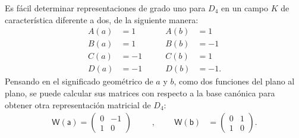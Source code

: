 \begin{ejemplo}[Representación de $D_4$]
Es fácil determinar representaciones de grado uno para $D_4$ en un campo $K$ de característica diferente a dos, de la siguiente manera:
\begin{equation*}
\begin{aligned}
A(a) & = 1\\
B(a) & = 1 \\ 
C(a) & = -1 \\
D(a) & = -1
\end{aligned}
\qquad 
\begin{aligned}
A(b) & = 1\\
B(b) & =  -1 \\
C(b) & = 1 \\
D(b) & = -1.
\end{aligned}
\end{equation*}
Pensando en el significado geométrico de $a$ y $b$, como dos funciones del plano al plano, se puede calcular sus matrices con respecto a la base canónica para obtener otra representación matricial de $D_4$:
\begin{equation*}
\begin{aligned}
\mathsf{W(a)} = \begin{pmatrix}
0 & -1 \\
1 & 0
\end{pmatrix}
\end{aligned}
\qquad \text{,} \qquad
\begin{aligned}
\mathsf{W(b)} &= \begin{pmatrix}
 0 & 1 \\
 1 & 0
\end{pmatrix}. 
\end{aligned}
\end{equation*}





\end{ejemplo}

